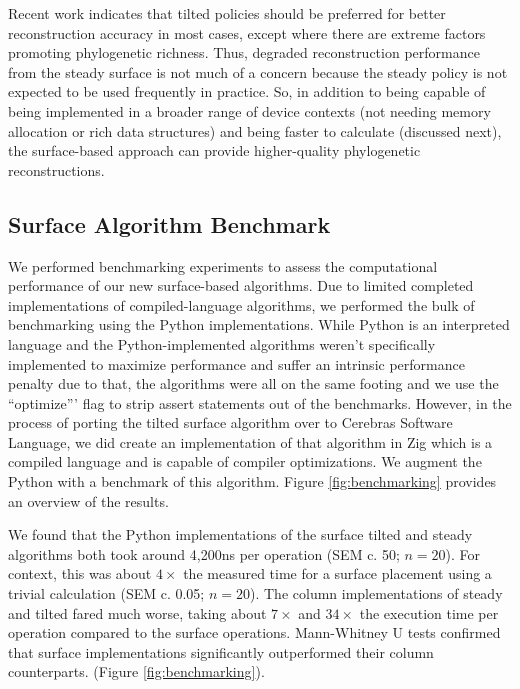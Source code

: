 Recent work indicates that tilted policies should be preferred for better reconstruction accuracy in most cases, except where there are extreme factors promoting phylogenetic richness.
Thus, degraded reconstruction performance from the steady surface is not much of a concern because the steady policy is not expected to be used frequently in practice.
So, in addition to being capable of being implemented in a broader range of device contexts (not needing memory allocation or rich data structures) and being faster to calculate (discussed next), the surface-based approach can provide higher-quality phylogenetic reconstructions.

\subsection{Surface Algorithm Benchmark}



We performed benchmarking experiments to assess the computational performance of our new surface-based algorithms.
Due to limited completed implementations of compiled-language algorithms, we performed the bulk of benchmarking using the Python implementations.
While Python is an interpreted language and the Python-implemented algorithms weren't specifically implemented to maximize performance and suffer an intrinsic performance penalty due to that, the algorithms were all on the same footing and we use the ``optimize''' flag to strip assert statements out of the benchmarks.
However, in the process of porting the tilted surface algorithm over to Cerebras Software Language, we did create an implementation of that algorithm in Zig which is a compiled language and is capable of compiler optimizations.
We augment the Python with a benchmark of this algorithm.
Figure \ref{fig:benchmarking} provides an overview of the results.

We found that the Python implementations of the surface tilted and steady algorithms both took around 4,200ns per operation (SEM c. 50; $n=20$).
For context, this was about $4\times$ the measured time for a surface placement using a trivial calculation (SEM c. 0.05; $n=20$).
The column implementations of steady and tilted fared much worse, taking about $7\times$ and $34\times$ the execution time per operation compared to the surface operations.
Mann-Whitney U tests confirmed that surface implementations significantly outperformed their column counterparts. (Figure \ref{fig:benchmarking}).

